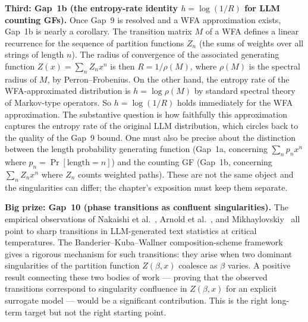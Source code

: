 \textbf{Third: Gap~1b (the entropy-rate identity $h = \log(1/R)$ for
LLM counting GFs).}  Once Gap~9 is resolved and a WFA approximation
exists, Gap~1b is nearly a corollary.  The transition matrix $M$ of a
WFA defines a linear recurrence for the sequence of partition functions
$Z_n$ (the sums of weights over all strings of length $n$).  The
radius of convergence of the associated generating function $Z(x) =
\sum_n Z_n x^n$ is then $R = 1/\rho(M)$, where $\rho(M)$ is the
spectral radius of $M$, by Perron--Frobenius.  On the other hand, the
entropy rate of the WFA-approximated distribution is $h = \log \rho(M)$
by standard spectral theory of Markov-type operators.  So $h = \log
(1/R)$ holds immediately for the WFA approximation.  The substantive
question is how faithfully this approximation captures the entropy rate
of the original LLM distribution, which circles back to the quality of
the Gap~9 bound.  One must also be precise about the distinction
between the length probability generating function (Gap~1a, concerning
$\sum_n p_n x^n$ where $p_n = \Pr[\text{length} = n]$) and the
counting GF (Gap~1b, concerning $\sum_n Z_n x^n$ where $Z_n$ counts
weighted paths).  These are not the same object and the singularities
can differ; the chapter's exposition must keep them separate.

\textbf{Big prize: Gap~10 (phase transitions as confluent
singularities).}  The empirical observations of Nakaishi et
al.~\cite{NakaishiNishikawaHukushima2024}, Arnold et
al.~\cite{ArnoldEtAl2024}, and
Mikhaylovskiy~\cite{Mikhaylovskiy2025} all point to sharp transitions
in LLM-generated text statistics at critical temperatures.  The
Banderier--Kuba--Wallner composition-scheme framework~\cite{BanderierKubaWallner2021}
gives a rigorous mechanism for such transitions: they arise when two
dominant singularities of the partition function $Z(\beta, x)$ coalesce
as $\beta$ varies.  A positive result connecting these two bodies of
work --- proving that the observed transitions correspond to singularity
confluence in $Z(\beta, x)$ for an explicit surrogate model --- would
be a significant contribution.  This is the right long-term target
but not the right starting point.

